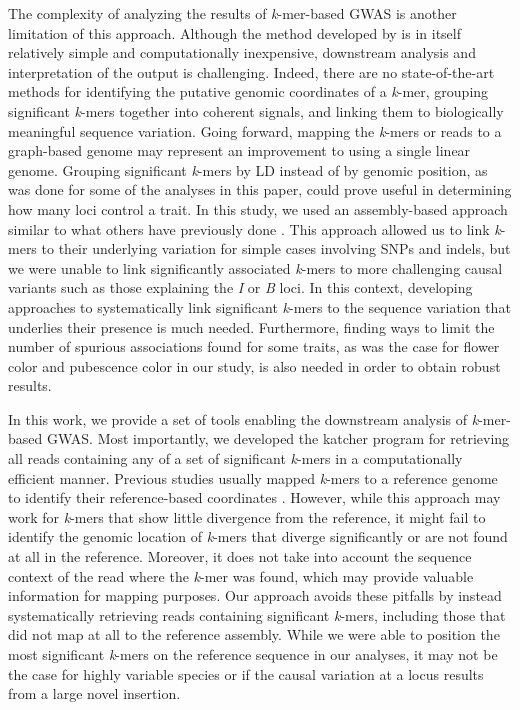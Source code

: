 The complexity of analyzing the results of \emph{k}-mer-based GWAS is
another limitation of this approach. Although the method developed by
\cite{voichek2020} is in itself relatively simple and computationally
inexpensive, downstream analysis and interpretation of the output is
challenging. Indeed, there are no state-of-the-art methods for identifying the
putative genomic coordinates of a \emph{k}-mer, grouping significant
\emph{k}-mers together into coherent signals, and linking them to biologically
meaningful sequence variation. Going forward, mapping
the \emph{k}-mers or reads to a graph-based genome \citep[using e.g. the vg
toolkit;][]{siren2021} may represent an
improvement to using a single linear genome.
Grouping significant \emph{k}-mers by LD instead of by genomic
position, as was done for some of the analyses in this paper, could prove
useful in determining how many loci control a trait. In this study, we used an
assembly-based approach similar to what others have previously done
\citep[e.g.][]{voichek2020, rahman2018}. This approach allowed us to link
\emph{k}-mers to their underlying variation for simple cases involving SNPs and
indels, but we were unable to link significantly associated \emph{k}-mers to
more challenging causal variants such as those explaining the \emph{I} or
\emph{B} loci. In this context, developing approaches to systematically link
significant \emph{k}-mers to the sequence variation that underlies their
presence is much needed. Furthermore, finding ways to limit the number of spurious
associations found for some traits, as was the case for flower color and
pubescence color in our study, is also needed in order to obtain robust results.

In this work, we provide a set of tools enabling the downstream
analysis of \emph{k}-mer-based GWAS. Most importantly, we developed the
katcher program for retrieving all reads containing
any of a set of significant \emph{k}-mers in a computationally efficient manner. Previous studies usually
mapped \emph{k}-mers to a reference genome to identify their reference-based
coordinates \citep[e.g.][]{voichek2020, he2021, rahman2018, tripodi2021}.
However, while this approach may work for \emph{k}-mers that show little
divergence from the reference, it might fail to identify the genomic location
of \emph{k}-mers that diverge significantly or are not found at all in the
reference. Moreover, it does not take into account the sequence context of the read where
the \emph{k}-mer was found, which may provide valuable information for mapping
purposes. Our approach avoids these pitfalls by instead systematically retrieving reads
containing significant \emph{k}-mers, including those that did not map at all
to the reference assembly. While we were able to position the most significant
\emph{k}-mers on the reference sequence in our analyses, it may not be the case
for highly variable species or if the causal variation at a locus results from
a large novel insertion.

